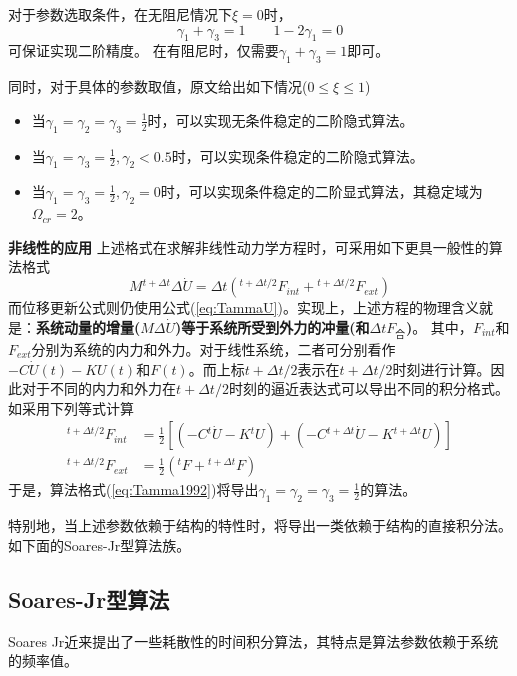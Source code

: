 对于参数选取条件，在无阻尼情况下$\xi=0$时，
\begin{equation}
\gamma_1+\gamma_3=1\qquad 1-2\gamma_1=0
\end{equation}
可保证实现二阶精度。
在有阻尼时，仅需要$\gamma_1+\gamma_3=1$即可。

同时，对于具体的参数取值，原文给出如下情况($0\le\xi\le1$)
\begin{itemize}
\item[\ddag] 当$\gamma_1=\gamma_2=\gamma_3=\frac{1}{2}$时，可以实现无条件稳定的二阶隐式算法\cite{Tamma1990}。
\item[\ddag] 当$\gamma_1=\gamma_3=\frac{1}{2},\gamma_2<0.5$时，可以实现条件稳定的二阶隐式算法。
\item[\ddag] 当$\gamma_1=\gamma_3=\frac{1}{2},\gamma_2=0$时，可以实现条件稳定的二阶显式算法\cite{Tamma1988,Tamma1988c,Tamma1989,Tamma1990a,Tamma1992}，其稳定域为$\Omega_{cr}=2$。
\end{itemize}

\textbf{非线性的应用} 上述格式在求解非线性动力学方程时，可采用如下更具一般性的算法格式\cite{Tamma1993}
\begin{equation}
M{^{t+\Delta t}\!\Delta \dot{U}}=\Delta t({^{t+\Delta t/2}\!F_{int}}+{^{t+\Delta t/2}\!F_{ext}})\label{eq:Tamma1992}
\end{equation}
而位移更新公式则仍使用公式(\ref{eq:TammaU})。实现上，上述方程的物理含义就是：\textbf{系统动量的增量($M\Delta \dot{U}$)等于系统所受到外力的冲量(和$\Delta tF_{\text{合}}$)}。
其中，$F_{int}$和$F_{ext}$分别为系统的内力和外力。对于线性系统，二者可分别看作$-C\dot{U}(t)-KU(t)$和$F(t)$。而上标$t+\Delta t/2$表示在$t+\Delta t/2$时刻进行计算。因此对于不同的内力和外力在$t+\Delta t/2$时刻的逼近表达式可以导出不同的积分格式。如采用下列等式计算
\begin{align}
{^{t+\Delta t/2}\!F_{int}}&=\frac{1}{2}[(-C{^t\!\dot{U}}-K{^t\!U})+(-C{^{t+\Delta t}\!\dot{U}}-K{^{t+\Delta t}\!U})]\\
{^{t+\Delta t/2}\!F_{ext}}&=\frac{1}{2}({^t\!F}+{^{t+\Delta t}\!F})
\end{align}
于是，算法格式(\ref{eq:Tamma1992})将导出$\gamma_1=\gamma_2=\gamma_3=\frac{1}{2}$的算法\cite{Tamma1990}。

特别地，当上述参数依赖于结构的特性时，将导出一类依赖于结构的直接积分法。如下面的Soares-Jr型算法族。
\subsection{Soares-Jr型算法}
Soares Jr近来提出了一些耗散性的时间积分算法\cite{Jr2014,Soares2014,Grosseholz2015,SoaresJr2016,Soares2015,Soares2016a,SoaresJr2016a}，其特点是算法参数依赖于系统的频率值。
